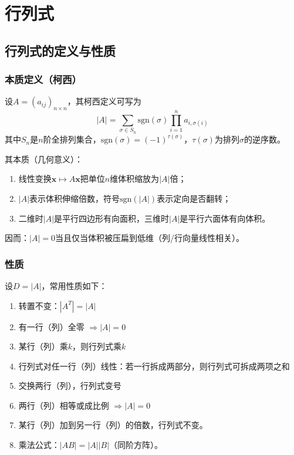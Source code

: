 \documentclass[./linear_algebra.tex]{subfiles}
\begin{document}
    \section{行列式}

    \subsection{行列式的定义与性质}

    \subsubsection{本质定义（柯西）}
    设$A=(a_{ij})_{n\times n}$，其柯西定义可写为
    \[
        |A|=\sum_{\sigma\in S_n}\mathrm{sgn}(\sigma)\prod_{i=1}^{n}a_{i,\sigma(i)}
    \]
    其中$S_n$是$n$阶全排列集合，$\mathrm{sgn}(\sigma)=(-1)^{\tau(\sigma)}$，$\tau(\sigma)$为排列$\sigma$的逆序数。

    其本质（几何意义）：
    \begin{enumerate}
        \item 线性变换$\mathbf{x}\mapsto A\mathbf{x}$把单位$n$维体积缩放为$|A|$倍；
        \item $|A|$表示体积伸缩倍数，符号$\mathrm{sgn}(|A|)$表示定向是否翻转；
        \item 二维时$|A|$是平行四边形有向面积，三维时$|A|$是平行六面体有向体积。
    \end{enumerate}
    因而：$|A|=0$当且仅当体积被压扁到低维（列/行向量线性相关）。

    \subsubsection{性质}
    设$D=|A|$，常用性质如下：
    \begin{enumerate}
        \item 转置不变：$|A^T|=|A|$
        \item 有一行（列）全零 $\Rightarrow |A|=0$
        \item 某行（列）乘$k$，则行列式乘$k$
        \item 行列式对任一行（列）线性：若一行拆成两部分，则行列式可拆成两项之和
        \item 交换两行（列），行列式变号
        \item 两行（列）相等或成比例 $\Rightarrow |A|=0$
        \item 某行（列）加到另一行（列）的倍数，行列式不变。
        \item 乘法公式：$|AB|=|A||B|$（同阶方阵）。
    \end{enumerate}
\end{document}
